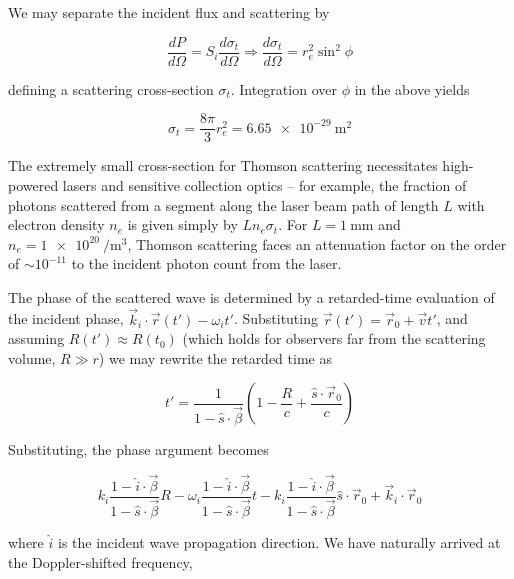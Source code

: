 \noindent We may separate the incident flux and scattering by

\begin{equation}\label{eq:ts_crosssection}
 \frac{dP}{d\Omega} = S_i \frac{d\sigma_t}{d\Omega} \Rightarrow \frac{d\sigma_t}{d\Omega} = r_e^2 \sin^2 \phi
\end{equation}

\noindent defining a scattering cross-section $\sigma_t$.  Integration over $\phi$ in the above yields

\begin{equation}\label{eq:sigmat}
 \sigma_t = \frac{8\pi}{3} r_e^2 = \SI{6.65e-29}{\square\meter}
\end{equation}

\noindent The extremely small cross-section for Thomson scattering necessitates high-powered lasers and sensitive collection optics -- for example, the fraction of photons scattered from a segment along the laser beam path of length $L$ with electron density $n_e$ is given simply by $Ln_e \sigma_t$.  For $L = \SI{1}{\milli\meter}$ and $n_e = \SI{1e20}{\per\cubic\meter}$, Thomson scattering faces an attenuation factor on the order of $\sim 10^{-11}$ to the incident photon count from the laser.

The phase of the scattered wave is determined by a retarded-time evaluation of the incident phase, $\vec{k}_i \cdot \vec{r}(t') - \omega_i t'$.  Substituting $\vec{r}(t') = \vec{r}_0 + \vec{v}t'$, and assuming $R(t') \approx R(t_0)$ (which holds for observers far from the scattering volume, $R \gg r$) we may rewrite the retarded time as

\begin{equation}
 t' = \frac{1}{1 - \hat{s} \cdot \vec{\beta}} \left( 1 - \frac{R}{c} + \frac{\hat{s} \cdot \vec{r}_0}{c} \right)
\end{equation}

\noindent Substituting, the phase argument becomes

\begin{equation}\label{eq:ts_phase}
 k_i \frac{1 - \hat{i} \cdot \vec{\beta}}{1 - \hat{s} \cdot \vec{\beta}} R - \omega_i \frac{1 - \hat{i} \cdot \vec{\beta}}{1 - \hat{s} \cdot \vec{\beta}} t - k_i \frac{1 - \hat{i} \cdot \vec{\beta}}{1 - \hat{s} \cdot \vec{\beta}} \hat{s} \cdot \vec{r}_0 + \vec{k}_i \cdot \vec{r}_0
\end{equation}

\noindent where $\hat{i}$ is the incident wave propagation direction.  We have naturally arrived at the Doppler-shifted frequency, 

